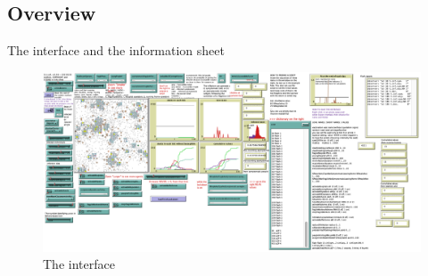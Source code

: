 \documentclass[8pt]{beamer}
\begin{document}
\subsection{Overview}

\begin{frame}{The interface and the information sheet}

\begin{figure}[H]
\center
\includegraphics[scale=0.14]{interface2021.png}

\caption{The interface} 
\label{interface}
\end{figure}

\end{frame}
\end{document}

